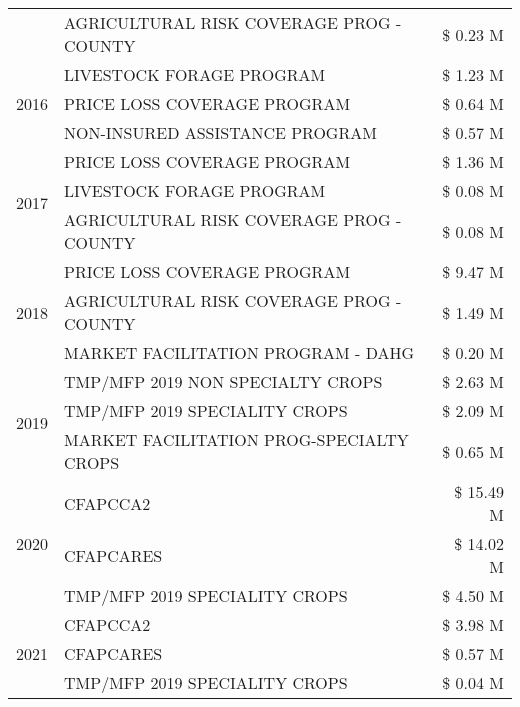 \begin{tabular}{llr}
 & AGRICULTURAL RISK COVERAGE PROG - COUNTY & \$ 0.23 M \\
\cline{1-3}
\multirow[t]{3}{*}{2016} & LIVESTOCK FORAGE PROGRAM                      & \$ 1.23 M \\
 & PRICE LOSS COVERAGE PROGRAM                   & \$ 0.64 M \\
 & NON-INSURED ASSISTANCE PROGRAM                & \$ 0.57 M \\
\cline{1-3}
\multirow[t]{3}{*}{2017} & PRICE LOSS COVERAGE PROGRAM & \$ 1.36 M \\
 & LIVESTOCK FORAGE PROGRAM & \$ 0.08 M \\
 & AGRICULTURAL RISK COVERAGE PROG - COUNTY & \$ 0.08 M \\
\cline{1-3}
\multirow[t]{3}{*}{2018} & PRICE LOSS COVERAGE PROGRAM & \$ 9.47 M \\
 & AGRICULTURAL RISK COVERAGE PROG - COUNTY & \$ 1.49 M \\
 & MARKET FACILITATION PROGRAM - DAHG & \$ 0.20 M \\
\cline{1-3}
\multirow[t]{3}{*}{2019} & TMP/MFP 2019 NON SPECIALTY CROPS & \$ 2.63 M \\
 & TMP/MFP 2019 SPECIALITY CROPS & \$ 2.09 M \\
 & MARKET FACILITATION PROG-SPECIALTY CROPS & \$ 0.65 M \\
\cline{1-3}
\multirow[t]{3}{*}{2020} & CFAPCCA2 & \$ 15.49 M \\
 & CFAPCARES & \$ 14.02 M \\
 & TMP/MFP 2019 SPECIALITY CROPS & \$ 4.50 M \\
\cline{1-3}
\multirow[t]{3}{*}{2021} & CFAPCCA2 & \$ 3.98 M \\
 & CFAPCARES & \$ 0.57 M \\
 & TMP/MFP 2019 SPECIALITY CROPS & \$ 0.04 M \\
\cline{1-3}
\bottomrule
\end{tabular}
